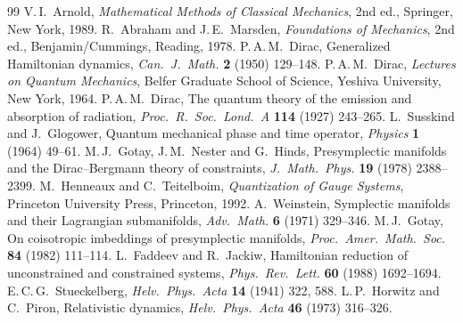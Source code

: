 \documentclass[11pt,a4paper]{article}
\theoremstyle{definition}
\theoremstyle{remark}
\begin{document}
\begin{thebibliography}{99}
 V.\,I.~Arnold, \emph{Mathematical Methods of Classical Mechanics}, 2nd ed., Springer, New York, 1989.
 R.~Abraham and J.\,E.~Marsden, \emph{Foundations of Mechanics}, 2nd ed., Benjamin/Cummings, Reading, 1978.
 P.\,A.\,M.~Dirac, Generalized Hamiltonian dynamics, \emph{Can.\ J.\ Math.} \textbf{2} (1950) 129--148.
 P.\,A.\,M.~Dirac, \emph{Lectures on Quantum Mechanics}, Belfer Graduate School of Science, Yeshiva University, New York, 1964.
 P.\,A.\,M.~Dirac, The quantum theory of the emission and absorption of radiation, \emph{Proc.\ R.\ Soc.\ Lond.\ A} \textbf{114} (1927) 243--265.
 L.~Susskind and J.~Glogower, Quantum mechanical phase and time operator, \emph{Physics} \textbf{1} (1964) 49--61.
 M.\,J.~Gotay, J.\,M.~Nester and G.~Hinds, Presymplectic manifolds and the Dirac--Bergmann theory of constraints, \emph{J.\ Math.\ Phys.} \textbf{19} (1978) 2388--2399.
 M.~Henneaux and C.~Teitelboim, \emph{Quantization of Gauge Systems}, Princeton University Press, Princeton, 1992.
 A.~Weinstein, Symplectic manifolds and their Lagrangian submanifolds, \emph{Adv.\ Math.} \textbf{6} (1971) 329--346.
 M.\,J.~Gotay, On coisotropic imbeddings of presymplectic manifolds, \emph{Proc.\ Amer.\ Math.\ Soc.} \textbf{84} (1982) 111--114.
 L.~Faddeev and R.~Jackiw, Hamiltonian reduction of unconstrained and constrained systems, \emph{Phys.\ Rev.\ Lett.} \textbf{60} (1988) 1692--1694.
 E.\,C.\,G.~Stueckelberg, \emph{Helv.\ Phys.\ Acta} \textbf{14} (1941) 322, 588.
 L.\,P.~Horwitz and C.~Piron, Relativistic dynamics, \emph{Helv.\ Phys.\ Acta} \textbf{46} (1973) 316--326.
\end{thebibliography}
\end{document}
